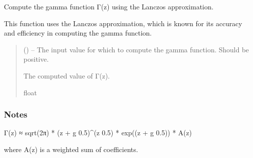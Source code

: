 \documentclass[a4paper,10pt,oneside,english]{sphinxmanual}
\begin{document}

\begin{fulllineitems}
\label{\detokenize{acsefunctions:acsefunctions.functions.gamma}}
\pysigstartsignatures
\pysiglinewithargsret
{}
{}
{}
\pysigstopsignatures
\sphinxAtStartPar
Compute the gamma function Γ(z) using the Lanczos approximation.

\sphinxAtStartPar
This function uses the Lanczos approximation, which is known for its
accuracy
and efficiency in computing the gamma function.
\begin{quote}\begin{description}
\sphinxAtStartPar
{} () – The input value for which to compute the gamma function.
Should be positive.

\sphinxAtStartPar
The computed value of Γ(z).

\sphinxAtStartPar
float

\end{description}\end{quote}
\subsubsection*{Notes}
\begin{description}
\sphinxAtStartPar
Γ(z) ≈ sqrt(2π) * (z + g \sphinxhyphen{} 0.5)\textasciicircum{}(z \sphinxhyphen{} 0.5) * exp(\sphinxhyphen{}(z + g \sphinxhyphen{} 0.5)) * A(z)

\end{description}

\sphinxAtStartPar
where A(z) is a weighted sum of coefficients.

\end{fulllineitems}

\end{document}
